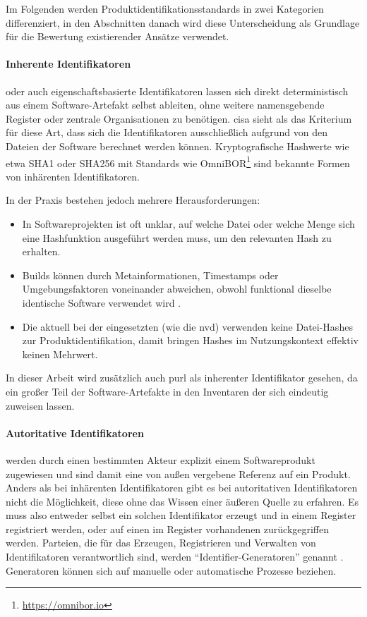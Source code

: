Im Folgenden werden Produktidentifikationsstandards in zwei Kategorien differenziert, in den Abschnitten danach wird diese Unterscheidung als Grundlage für die Bewertung existierender Ansätze verwendet.

\paragraph{Inherente Identifikatoren} %
oder auch eigenschaftsbasierte Identifikatoren lassen sich direkt deterministisch aus einem Software-Artefakt selbst ableiten, ohne weitere namensgebende Register oder zentrale Organisationen zu benötigen.
\acrshort{cisa} sieht als das Kriterium für diese Art, dass sich die Identifikatoren ausschließlich aufgrund von den Dateien der Software berechnet werden können.
Kryptografische Hashwerte wie etwa SHA1 oder SHA256 mit Standards wie OmniBOR\footnote{\url{https://omnibor.io}} sind bekannte Formen von inhärenten Identifikatoren.

In der Praxis bestehen jedoch mehrere Herausforderungen:
\begin{itemize}
    \itemsep0em
    \item In Softwareprojekten ist oft unklar, auf welche Datei oder welche Menge sich eine Hashfunktion ausgeführt werden muss, um den relevanten Hash zu erhalten.
    \item Builds können durch Metainformationen, Timestamps oder Umgebungsfaktoren voneinander abweichen, obwohl funktional dieselbe identische Software verwendet wird \autocite{CISA2023}.
    \item Die aktuell bei der \metaeffektsp eingesetzten  (wie die \acrshort{nvd}) verwenden keine Datei-Hashes zur Produktidentifikation, damit bringen Hashes im Nutzungskontext effektiv keinen Mehrwert.
\end{itemize}

In dieser Arbeit wird zusätzlich auch \acrshort{purl} als inherenter Identifikator gesehen, da ein großer Teil der Software-Artefakte in den Inventaren der \metaeffektsp sich eindeutig  zuweisen lassen.

\paragraph{Autoritative Identifikatoren}\label{par:authorative-identifiers} %
werden durch einen bestimmten Akteur explizit einem Softwareprodukt zugewiesen und sind damit eine von außen vergebene Referenz auf ein Produkt.
Anders als bei inhärenten Identifikatoren gibt es bei autoritativen Identifikatoren nicht die Möglichkeit, diese ohne das Wissen einer äußeren Quelle zu erfahren.
Es muss also entweder selbst ein solchen Identifikator erzeugt und in einem Register registriert werden, oder auf einen im Register vorhandenen zurückgegriffen werden.
Parteien, die für das Erzeugen, Registrieren und Verwalten von Identifikatoren verantwortlich sind, werden \enquote{Identifier-Generatoren} genannt \autocite{CISA2023}.
Generatoren können sich auf manuelle oder automatische Prozesse beziehen.

